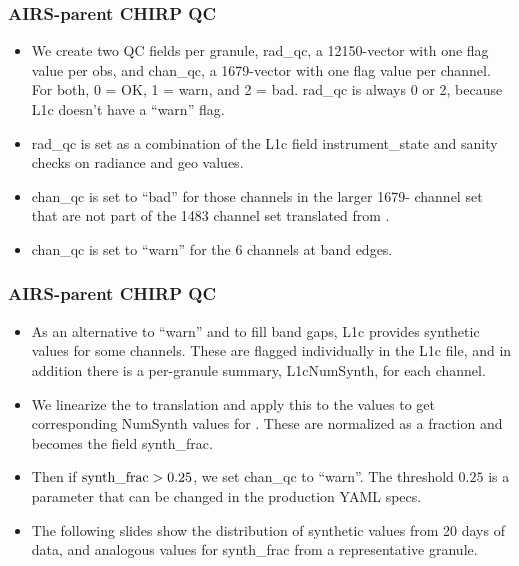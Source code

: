 \documentclass[9pt]{beamer}
\begin{document}
\begin{frame}
\frametitle{AIRS-parent CHIRP QC}

\begin{itemize}

  \item We create two QC fields per granule, rad\_qc, a 12150-vector
    with one flag value per obs, and chan\_qc, a 1679-vector with one
    flag value per channel.  For both, 0 = OK, 1 = warn, and 2 = bad.
    rad\_qc is always 0 or 2, because {\airs} L1c doesn't have a ``warn''
    flag.

  \item rad\_qc is set as a combination of the {\airs} L1c field
    instrument\_state and sanity checks on radiance and geo values.

  \item chan\_qc is set to ``bad'' for those channels in the larger
    {\chirp} 1679- channel set that are not part of the 1483 channel
    set translated from {\airs}.

  \item chan\_qc is set to ``warn'' for the 6 channels at band edges.

\end{itemize}
\end{frame}
\begin{frame}
\frametitle{AIRS-parent CHIRP QC}

\begin{itemize}

  \item As an alternative to ``warn'' and to fill band gaps, {\airs}
    L1c provides synthetic values for some channels.  These are
    flagged individually in the L1c file, and in addition there is a
    per-granule summary, L1cNumSynth, for each channel.

  \item We linearize the {\airs} to {\cris} translation and apply
    this to the {\airs} values to get corresponding NumSynth values
    for {\chirp}.  These are normalized as a fraction and becomes
    the {\chirp} field synth\_frac.

  \item Then if $\hbox{synth\_frac} > 0.25$, we set chan\_qc to
    ``warn''.  The threshold $0.25$ is a parameter that can be changed
    in the production YAML specs.

  \item The following slides show the distribution of synthetic
    values from 20 days of {\airs} data, and analogous values for
    synth\_frac from a representative {\chirp} granule.

\end{itemize}
\end{frame}
\end{document}
